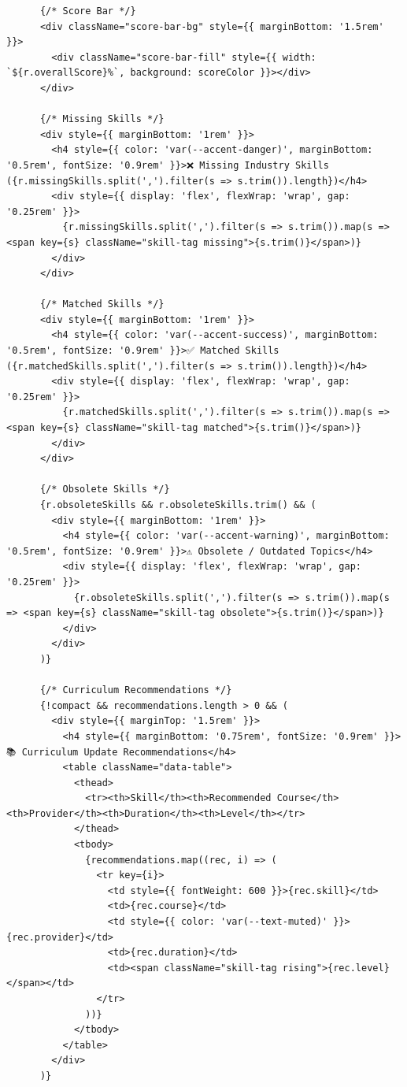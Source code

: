 \documentclass[12pt,a4paper]{report}
\begin{document}
\begin{verbatim}
      {/* Score Bar */}
      <div className="score-bar-bg" style={{ marginBottom: '1.5rem' }}>
        <div className="score-bar-fill" style={{ width: `${r.overallScore}%`, background: scoreColor }}></div>
      </div>

      {/* Missing Skills */}
      <div style={{ marginBottom: '1rem' }}>
        <h4 style={{ color: 'var(--accent-danger)', marginBottom: '0.5rem', fontSize: '0.9rem' }}>❌ Missing Industry Skills ({r.missingSkills.split(',').filter(s => s.trim()).length})</h4>
        <div style={{ display: 'flex', flexWrap: 'wrap', gap: '0.25rem' }}>
          {r.missingSkills.split(',').filter(s => s.trim()).map(s => <span key={s} className="skill-tag missing">{s.trim()}</span>)}
        </div>
      </div>

      {/* Matched Skills */}
      <div style={{ marginBottom: '1rem' }}>
        <h4 style={{ color: 'var(--accent-success)', marginBottom: '0.5rem', fontSize: '0.9rem' }}>✅ Matched Skills ({r.matchedSkills.split(',').filter(s => s.trim()).length})</h4>
        <div style={{ display: 'flex', flexWrap: 'wrap', gap: '0.25rem' }}>
          {r.matchedSkills.split(',').filter(s => s.trim()).map(s => <span key={s} className="skill-tag matched">{s.trim()}</span>)}
        </div>
      </div>

      {/* Obsolete Skills */}
      {r.obsoleteSkills && r.obsoleteSkills.trim() && (
        <div style={{ marginBottom: '1rem' }}>
          <h4 style={{ color: 'var(--accent-warning)', marginBottom: '0.5rem', fontSize: '0.9rem' }}>⚠️ Obsolete / Outdated Topics</h4>
          <div style={{ display: 'flex', flexWrap: 'wrap', gap: '0.25rem' }}>
            {r.obsoleteSkills.split(',').filter(s => s.trim()).map(s => <span key={s} className="skill-tag obsolete">{s.trim()}</span>)}
          </div>
        </div>
      )}

      {/* Curriculum Recommendations */}
      {!compact && recommendations.length > 0 && (
        <div style={{ marginTop: '1.5rem' }}>
          <h4 style={{ marginBottom: '0.75rem', fontSize: '0.9rem' }}>📚 Curriculum Update Recommendations</h4>
          <table className="data-table">
            <thead>
              <tr><th>Skill</th><th>Recommended Course</th><th>Provider</th><th>Duration</th><th>Level</th></tr>
            </thead>
            <tbody>
              {recommendations.map((rec, i) => (
                <tr key={i}>
                  <td style={{ fontWeight: 600 }}>{rec.skill}</td>
                  <td>{rec.course}</td>
                  <td style={{ color: 'var(--text-muted)' }}>{rec.provider}</td>
                  <td>{rec.duration}</td>
                  <td><span className="skill-tag rising">{rec.level}</span></td>
                </tr>
              ))}
            </tbody>
          </table>
        </div>
      )}


\end{verbatim}
\end{document}
